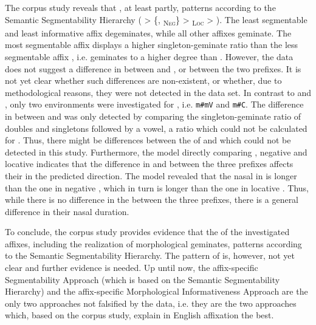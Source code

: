 The corpus study reveals that , at least partly, patterns according to the Semantic Segmentability Hierarchy ( > \{, \textsubscript{\textsc{Neg}}\} >  \textsubscript{\textsc{Loc}} > ). 
The least segmentable and least informative affix  degeminates, while all other affixes geminate. The most segmentable affix  displays a higher singleton-geminate ratio than the less segmentable affix , i.e.  geminates to a higher degree than . However, the data does not suggest a difference in  between  and , or between the two prefixes.
 It is not yet clear whether such differences are non-existent, or whether, due to methodological reasons, they were not detected in the data set. 
  In contrast to  and , only two environments were investigated for , i.e. \texttt{m\#mV} and \texttt{m\#C}. The difference in  between  and  was only detected by comparing the singleton-geminate ratio of doubles and singletons followed by a vowel, a ratio which could not be calculated for . Thus, there might be differences between the  of  and  which could not be detected in this study.
Furthermore, the model directly comparing , negative  and locative  indicates that the difference in  and  between the three prefixes affects their  in the predicted direction. The model revealed that the nasal in  is longer than the one in negative , which in turn is longer than the one in locative . Thus, while there is no difference in the  between the three prefixes, there is a general difference in  their nasal duration.
 
 To conclude, the corpus study provides evidence that the  of the investigated affixes, including the realization of morphological geminates, patterns according to the Semantic Segmentability Hierarchy. The pattern of  is, however, not yet clear and further evidence is needed. 
 Up until now, the affix-specific Segmentability Approach (which is based on the Semantic Segmentability Hierarchy) and the affix-specific Morphological Informativeness Approach are the only two approaches not falsified by the data, i.e. they are the two approaches which, based on the corpus study, explain  in English affixation the best.


